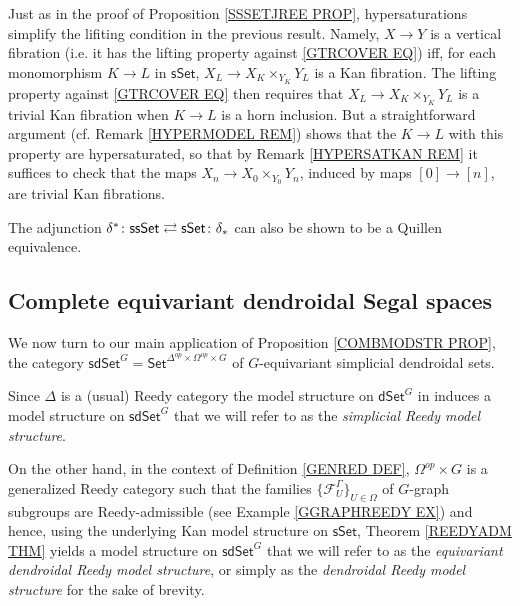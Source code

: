 \documentclass[a4paper,10pt
 ,draft
]{article}%
\begin{document}
\begin{remark}\label{HYPERSIMPL REM}
	Just as in the proof of Proposition \ref{SSSETJREE PROP}, hypersaturations simplify the lifiting condition
	in the previous result. 
	Namely,	$X \to Y$ is a vertical fibration (i.e. it has the lifting property against \eqref{GTRCOVER EQ})
	iff, for each monomorphism $K \to L$ in $\mathsf{sSet}$,
	$X_L \to X_K \times_{Y_K} Y_L$
	is a Kan fibration.
	The lifting property against \eqref{GTRCOVER EQ}
	then requires that 
	$X_L \to X_K \times_{Y_K} Y_L$ is a trivial Kan fibration
	when $K \to L$ is a horn inclusion. 
	But a straightforward argument (cf. Remark \ref{HYPERMODEL REM}) shows that the $K \to L$ with this property are hypersaturated,
	so that by 
Remark \ref{HYPERSATKAN REM} it suffices to check that the maps $X_n \to X_0 \times_{Y_0} Y_n$, induced by maps $[0] \to [n]$, are trivial Kan fibrations.
\end{remark}


\begin{remark}
The adjunction 
$
	\delta^{\**}\colon \mathsf{ssSet}
		\rightleftarrows 
	\mathsf{sSet} \colon \delta_{\**}
$
can also be shown to be a Quillen equivalence.
\end{remark}


\subsection{Complete equivariant dendroidal Segal spaces}
\label{CEDSS SEC}


We now turn to our main application of Proposition \ref{COMBMODSTR PROP}, the category 
$\mathsf{sdSet}^G = \mathsf{Set}^{\Delta^{op} \times \Omega^{op} \times G}$
of $G$-equivariant simplicial dendroidal sets.

Since $\Delta$ is a (usual) Reedy category the model structure on $\mathsf{dSet}^G$ 
in \cite[Thm. 2.1]{Per18} induces 
a model structure on $\mathsf{sdSet}^G$
that we will refer to as the \textit{simplicial Reedy model structure}.

On the other hand, in the context of Definition \ref{GENRED DEF},
$\Omega^{op} \times G$ is a generalized Reedy category such that the families $\{\mathcal{F}_{U}^{\Gamma}\}_{U \in \Omega}$
of $G$-graph subgroups are Reedy-admissible 
(see Example \ref{GGRAPHREEDY EX})
and hence, using the underlying 
Kan model structure on $\mathsf{sSet}$, 
Theorem \ref{REEDYADM THM} yields
a model structure on $\mathsf{sdSet}^G$
that we will refer to as the \textit{equivariant dendroidal Reedy model structure}, 
or simply as the \textit{dendroidal Reedy model structure} for the sake of brevity.
\end{document}
